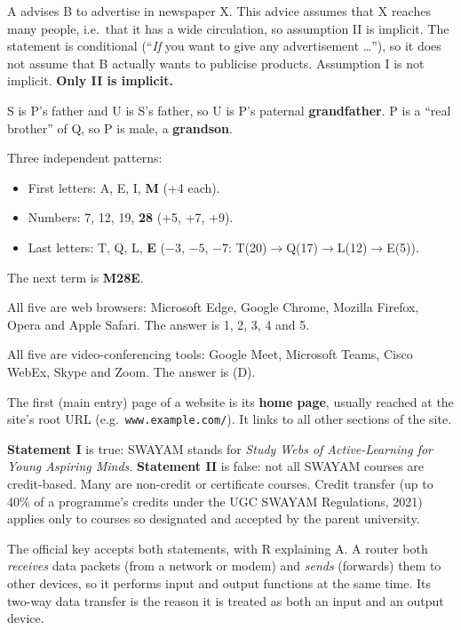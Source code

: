 A advises B to advertise in newspaper X. This advice assumes that X reaches many people, i.e.\ that it has a wide circulation, so assumption II is implicit. The statement is conditional (``\emph{If} you want to give any advertisement \ldots''), so it does not assume that B actually wants to publicise products. Assumption I is not implicit.
\textbf{Only II is implicit.}

S is P's father and U is S's father, so U is P's paternal \textbf{grandfather}. P is a ``real brother'' of Q, so P is male, a \textbf{grandson}.
\begin{center}
\end{center}

Three independent patterns:
\begin{itemize}
\item First letters: A, E, I, \textbf{M} (+4 each).
\item Numbers: 7, 12, 19, \textbf{28} (+5, +7, +9).
\item Last letters: T, Q, L, \textbf{E} ($-3$, $-5$, $-7$: T(20)$\rightarrow$Q(17)$\rightarrow$L(12)$\rightarrow$E(5)).
\end{itemize}
The next term is \textbf{M28E}.

All five are web browsers: Microsoft Edge, Google Chrome, Mozilla Firefox, Opera and Apple Safari. The answer is 1, 2, 3, 4 and 5.

All five are video-conferencing tools: Google Meet, Microsoft Teams, Cisco WebEx, Skype and Zoom. The answer is (D).

The first (main entry) page of a website is its \textbf{home page}, usually reached at the site's root URL (e.g.\ \texttt{www.example.com/}). It links to all other sections of the site.

\textbf{Statement I} is true: SWAYAM stands for \emph{Study Webs of Active-Learning for Young Aspiring Minds}.
\textbf{Statement II} is false: not all SWAYAM courses are credit-based. Many are non-credit or certificate courses. Credit transfer (up to 40\% of a programme's credits under the UGC SWAYAM Regulations, 2021) applies only to courses so designated and accepted by the parent university.

The official key accepts both statements, with R explaining A. A router both \emph{receives} data packets (from a network or modem) and \emph{sends} (forwards) them to other devices, so it performs input and output functions at the same time. Its two-way data transfer is the reason it is treated as both an input and an output device.

